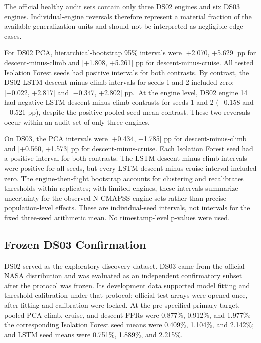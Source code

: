 \documentclass[10pt,twocolumn]{article}
\begin{document}
The official healthy audit sets contain only three DS02 engines and six DS03 engines. Individual-engine reversals therefore represent a material fraction of the available generalization units and should not be interpreted as negligible edge cases.

For DS02 PCA, hierarchical-bootstrap 95\% intervals were {[}+2.070, +5.629{]} pp for descent-minus-climb and {[}+1.808, +5.261{]} pp for descent-minus-cruise. All tested Isolation Forest seeds had positive intervals for both contrasts. By contrast, the DS02 LSTM descent-minus-climb intervals for seeds 1 and 2 included zero: {[}−0.022, +2.817{]} and {[}−0.347, +2.802{]} pp.~At the engine level, DS02 engine 14 had negative LSTM descent-minus-climb contrasts for seeds 1 and 2 (−0.158 and −0.521 pp), despite the positive pooled seed-mean contrast. These two reversals occur within an audit set of only three engines.

On DS03, the PCA intervals were {[}+0.434, +1.785{]} pp for descent-minus-climb and {[}+0.560, +1.573{]} pp for descent-minus-cruise. Each Isolation Forest seed had a positive interval for both contrasts. The LSTM descent-minus-climb intervals were positive for all seeds, but every LSTM descent-minus-cruise interval included zero. The engine-then-flight bootstrap accounts for clustering and recalibrates thresholds within replicates; with limited engines, these intervals summarize uncertainty for the observed N-CMAPSS engine sets rather than precise population-level effects. These are individual-seed intervals, not intervals for the fixed three-seed arithmetic mean. No timestamp-level p-values were used.

\subsection{Frozen DS03 Confirmation}\label{frozen-ds03-confirmation}

DS02 served as the exploratory discovery dataset. DS03 came from the official NASA distribution and was evaluated as an independent confirmatory subset after the protocol was frozen. Its development data supported model fitting and threshold calibration under that protocol; official-test arrays were opened once, after fitting and calibration were locked. At the pre-specified primary target, pooled PCA climb, cruise, and descent FPRs were 0.877\%, 0.912\%, and 1.977\%; the corresponding Isolation Forest seed means were 0.409\%, 1.104\%, and 2.142\%; and LSTM seed means were 0.751\%, 1.889\%, and 2.215\%.
\end{document}
